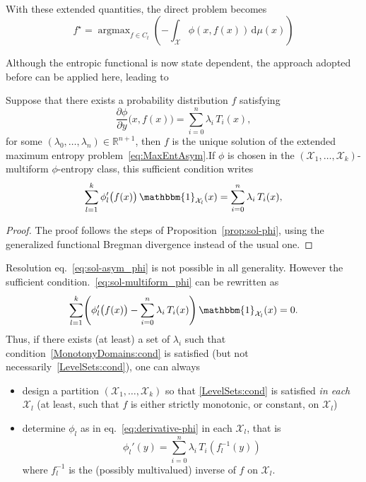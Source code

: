 \documentclass[entropy,article,submit,moreauthors,pdftex]{Definitions/mdpi}
\def\dmu{\mathrm{d}\mu}
\def\Rset{\mathbb{R}}
\def\X{\mathcal{X}}
\def\un{\mathbbm{1}}
\DeclareMathOperator*{\argmax}{\operatorname{argmax}}
\begin{document}
\

With these extended quantities, the direct problem becomes
%
\begin{equation}\label{eq:MaxEntAsym}
f^\star = \argmax_{f \in C_t} \left( - \int_\X \phi(x,f(x)) \, \dmu(x) \right)
\end{equation}

Although the  entropic functional is  now state dependent, the  approach adopted
before can be applied here, leading to

\begin{Proposition}
\label{prop:sol-asym_phi}
%
  Suppose that there exists a probability distribution $f$ satisfying
  \begin{equation}\label{eq:sol-asym_phi}
  \frac{\partial \phi}{\partial y}\big(x,f(x)\big) = \sum_{i=0}^n \lambda_i \,
  T_i(x),
  \end{equation}
  for  some  $(\lambda_0,\ldots,\lambda_n) \in  \Rset^{n+1}$,  then  $f$ is  the
  unique      solution      of       the      extended      maximum      entropy
  problem~\eqref{eq:MaxEntAsym}.\newline  If $\phi$  is chosen  in the  $(\X_1 ,
  \ldots  , \X_k)$-multiform  $\phi$-entropy  class,  this sufficient  condition
  writes
  \begin{equation}\label{eq:sol-multiform_phi}
  \sum_{l=1}^k \phi_l'\big(f(x)\big) \, \un_{\X_l}(x) = \sum_{i=0}^n \lambda_i
  \, T_i(x),
  \end{equation}
\end{Proposition}
%
\begin{proof}
  The  proof  follows the  steps  of  Proposition~\ref{prop:sol-phi}, using  the
  generalized functional Bregman divergence instead of the usual one.
\end{proof}

Resolution  eq.~\eqref{eq:sol-asym_phi}  is  not  possible  in  all  generality.
However the sufficient  condition.~\eqref{eq:sol-multiform_phi} can be rewritten
as
%
\begin{equation}\label{eq:sol-multiform_phi_partitioned}
\sum_{l=1}^k \left( \phi_l'\big(f(x)\big) - \sum_{i=0}^n \lambda_i \, T_i(x)
\right) \, \un_{\X_l}(x) = 0.
\end{equation}
%
Thus,   if  there   exists  (at   least)  a   set  of   $\lambda_i$  such   that
condition~\ref{MonotonyDomains:cond}       is      satisfied       (but      not
necessarily~\ref{LevelSets:cond}), one can always
%
\begin{itemize}
\item design  a partition  $(\X_1,\ldots,\X_k)$ so that  \ref{LevelSets:cond} is
  satisfied {\em  in each $\X_l$}  (at least, such  that $f$ is  either strictly
  monotonic, or constant, on $\X_l$)
%
\item  determine $\phi_l$  as in  eq.~\eqref{eq:derivative-phi} in  each $\X_l$,
  that is
  \begin{equation}\label{eq:derivative-phil}
  \phi_l'(y) = \sum_{i=0}^n \lambda_i \, T_i\!\left(f_l^{-1}(y)\right)
  \end{equation}
  where $f_l^{-1}$ is the (possibly multivalued) inverse of $f$ on $\X_l$.
\end{itemize}
\end{document}

